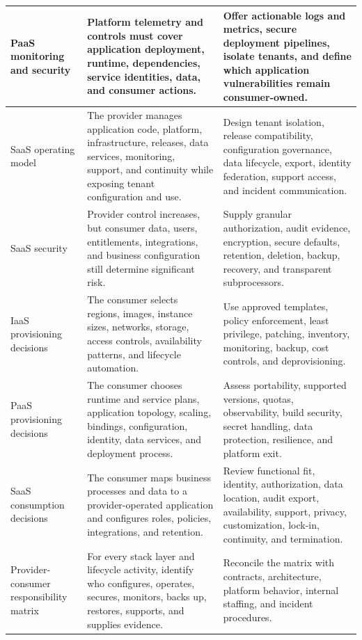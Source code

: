 \documentclass[11pt]{article}
\begin{document}
\begin{longtable}{@{}>{\RaggedRight\arraybackslash}p{}>{\RaggedRight\arraybackslash}p{}>{\RaggedRight\arraybackslash}p{}@{}}
PaaS monitoring and security & Platform telemetry and controls must cover application deployment, runtime, dependencies, service identities, data, and consumer actions. & Offer actionable logs and metrics, secure deployment pipelines, isolate tenants, and define which application vulnerabilities remain consumer-owned. \\\midrule
SaaS operating model & The provider manages application code, platform, infrastructure, releases, data services, monitoring, support, and continuity while exposing tenant configuration and use. & Design tenant isolation, release compatibility, configuration governance, data lifecycle, export, identity federation, support access, and incident communication. \\\midrule
SaaS security & Provider control increases, but consumer data, users, entitlements, integrations, and business configuration still determine significant risk. & Supply granular authorization, audit evidence, encryption, secure defaults, retention, deletion, backup, recovery, and transparent subprocessors. \\\midrule
IaaS provisioning decisions & The consumer selects regions, images, instance sizes, networks, storage, access controls, availability patterns, and lifecycle automation. & Use approved templates, policy enforcement, least privilege, patching, inventory, monitoring, backup, cost controls, and deprovisioning. \\\midrule
PaaS provisioning decisions & The consumer chooses runtime and service plans, application topology, scaling, bindings, configuration, identity, data services, and deployment process. & Assess portability, supported versions, quotas, observability, build security, secret handling, data protection, resilience, and platform exit. \\\midrule
SaaS consumption decisions & The consumer maps business processes and data to a provider-operated application and configures roles, policies, integrations, and retention. & Review functional fit, identity, authorization, data location, audit export, availability, support, privacy, customization, lock-in, continuity, and termination. \\\midrule
Provider-consumer responsibility matrix & For every stack layer and lifecycle activity, identify who configures, operates, secures, monitors, backs up, restores, supports, and supplies evidence. & Reconcile the matrix with contracts, architecture, platform behavior, internal staffing, and incident procedures. \\\midrule
\bottomrule
\end{longtable}
\endgroup
\end{document}
